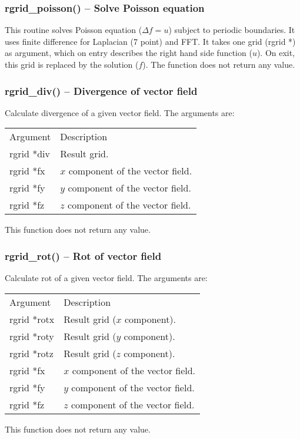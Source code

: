 \documentclass[12pt,letterpaper]{article}
\begin{document}
\subsubsection{rgrid\_poisson() -- Solve Poisson equation}

This routine solves Poisson equation ($\Delta f = u$) subject to periodic boundaries. It
uses finite difference for Laplacian (7 point) and FFT. It takes one grid (rgrid *) as argument, which on entry describes the right hand side function ($u$). On exit, this grid is replaced by the solution ($f$). The function does not return any value.

\subsubsection{rgrid\_div() -- Divergence of vector field}

Calculate divergence of a given vector field. The arguments are:
\begin{longtable}{p{} p{}}
Argument & Description\\
\cline{1-2}
rgrid *div & Result grid.\\
rgrid *fx  & $x$ component of the vector field.\\
rgrid *fy  & $y$ component of the vector field.\\
rgrid *fz  & $z$ component of the vector field.\\
\end{longtable}
\noindent
This function does not return any value. 

\subsubsection{rgrid\_rot() -- Rot of vector field}

Calculate rot of a given vector field. The arguments are:
\begin{longtable}{p{} p{}}
Argument & Description\\
\cline{1-2}
rgrid *rotx & Result grid ($x$ component).\\
rgrid *roty & Result grid ($y$ component).\\
rgrid *rotz & Result grid ($z$ component).\\
rgrid *fx  & $x$ component of the vector field.\\
rgrid *fy  & $y$ component of the vector field.\\
rgrid *fz  & $z$ component of the vector field.\\
\end{longtable}
\noindent
This function does not return any value. 
\end{document}
